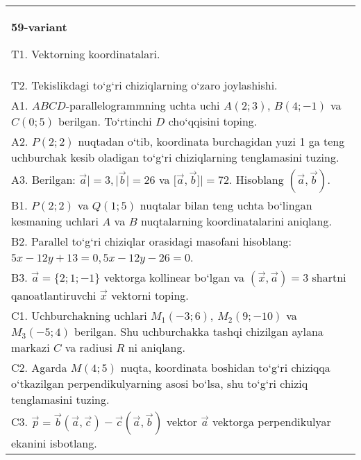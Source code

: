 \documentclass{article}
\begin{document}
\begin{tabular}{m{17cm}}
\textbf{59-variant}
\newline

T1. 
Vektorning koordinatalari.
 \\
T2. 
Tekislikdagi to‘g‘ri chiziqlarning o‘zaro joylashishi.
 \\
A1. 
$ABCD$-parallelogrammning uchta uchi
$A (2;3) $, $B (4;-1) $ va $C (0;5) $ berilgan. To‘rtinchi $D$
cho‘qqisini toping.
 \\
A2. 
$P (2;2)$ nuqtadan o‘tib, koordinata burchagidan
yuzi 1 ga teng uchburchak kesib oladigan to‘g‘ri chiziqlarning
tenglamasini tuzing.
 \\
A3. 
Berilgan: $\overrightarrow{a}| = 3,|\overrightarrow{b}| = 26$ va
$\lbrack\overrightarrow{a},\overrightarrow{b}\rbrack| = 72$. Hisoblang
$\left(\overrightarrow{a},\overrightarrow{b} \right) $.
 \\
B1. 
\(P (2;2) \) va \(Q (1;5) \) nuqtalar bilan teng uchta
bo‘lingan kesmaning uchlari $A$ va $B$ nuqtalarning
koordinatalarini aniqlang.
 \\
B2. 
Parallel to‘g‘ri chiziqlar orasidagi masofani hisoblang: $5x-12y+13=0, 5x-12y-26=0$.
 \\
B3. 
$\vec{a} = \{ 2;1; - 1\}$ vektorga kollinear bo‘lgan va $\left(\vec{x},\vec{a} \right) = 3$ shartni qanoatlantiruvchi $\vec{x}$ vektorni toping.
 \\
C1. 
Uchburchakning uchlari \(M_{1} (- 3;6),\ M_{2} (9; - 10) \)
va \(M_{3} (-5;4) \) berilgan. Shu uchburchakka tashqi chizilgan
aylana markazi $C$ va radiusi $R$ ni aniqlang.
 \\
C2. 
Agarda \(M (4;5) \) nuqta, koordinata boshidan to‘g‘ri chiziqqa
o‘tkazilgan perpendikulyarning asosi bo‘lsa, shu to‘g‘ri chiziq tenglamasini
tuzing.
 \\
C3. 
\(\vec{p} = \vec{b} (\vec{a},\vec{c}) - \vec{c} (\vec{a},\vec{b}) \) vektor \(\vec{a}\) vektorga perpendikulyar ekanini isbotlang.
 \\

\end{tabular}
\vspace{1cm}
\end{document}
